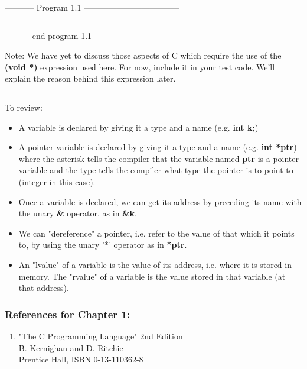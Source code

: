 -----------  Program 1.1  -----------------------------------
\inputminted{c}{../src/ch1-1.c}
--------- end program 1.1 -----------------------------------

Note: We have yet to discuss those aspects of C which require the use of
the \textbf{(void *)} expression used here. For now, include it in your
test code. We'll explain the reason behind this expression later.

\begin{center}\rule{0.5\linewidth}{\linethickness}\end{center}

To review:

\begin{itemize}
\tightlist
\item
  A variable is declared by giving it a type and a name (e.g.
  \textbf{int k;})
\item
  A pointer variable is declared by giving it a type and a name (e.g.
  \textbf{int *ptr}) where the asterisk tells the compiler that the
  variable named \textbf{ptr} is a pointer variable and the type tells
  the compiler what type the pointer is to point to (integer in this
  case).
\item
  Once a variable is declared, we can get its address by preceding its
  name with the unary \textbf{\&} operator, as in \textbf{\&k}.
\item
  We can "dereference" a pointer, i.e. refer to the value of that which
  it points to, by using the unary '*' operator as in \textbf{*ptr}.
\item
  An "lvalue" of a variable is the value of its address, i.e. where it
  is stored in memory. The "rvalue" of a variable is the value stored in
  that variable (at that address).
\end{itemize}

\hypertarget{references-for-chapter-1}{%
\subsubsection{References for Chapter
1:}\label{references-for-chapter-1}}

\begin{enumerate}
\tightlist
\item
  "The C Programming Language" 2nd Edition\\
  B. Kernighan and D. Ritchie\\
  Prentice Hall, ISBN 0-13-110362-8\\
\end{enumerate}

\begin{comment}
\href{ch2x.htm}{Chapter 2: Pointer Types and Arrays.}

\href{pointers.htm}{Back to Table of Contents}
\end{comment}
